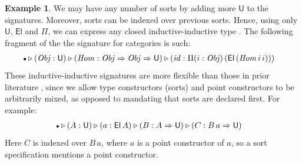 \documentclass[12pt,a4paper,twoside,openany]{book}
\theoremstyle{remark}
\theoremstyle{definition}
\newtheorem{myexample}{Example}
\theoremstyle{theorem}
\newcommand{\mi}[1]{\mathit{#1}}
\newcommand{\U}{\mathsf{U}}
\newcommand{\El}{\mathsf{El}}
\newcommand{\ext}{\triangleright}
\newcommand{\emptycon}{\scaleobj{.75}\bullet}
\newcommand{\funi}{\Rightarrow}
\begin{document}
\begin{myexample}
We may have any number of sorts by adding more $\U$ to the signatures. Moreover,
sorts can be indexed over previous sorts. Hence, using only $\U$, $\El$ and
$\Pi$, we can express any closed inductive-inductive type
\cite{forsberg-phd}. The following fragment of the the signature for categories
is such:
\begin{alignat*}{3}
  & \emptycon \ext (\mi{Obj} : \U) \ext (\mi{Hom} : \mi{Obj} \funi \mi{Obj} \funi \U)
      \ext (\mi{id} : \Pi(i : \mi{Obj})\,(\El\,(\mi{Hom}\,i\,i)))
\end{alignat*}
These inductive-inductive signatures are more flexible than those in prior
literature \cite{forsberg-phd}, since we allow type constructors (sorts) and
point constructors to be arbitrarily mixed, as opposed to mandating that sorts
are declared first. For example:
\begin{alignat*}{3}
  & \emptycon \ext (A : \U) \ext (a : \El\,A) \ext (B : A \funi \U) \ext (C : B\,a \funi \U)
\end{alignat*}
Here $C$ is indexed over $B\,a$, where $a$ is a point constructor of $a$, so a
sort specification mentions a point constructor.
\end{myexample}
\end{document}
